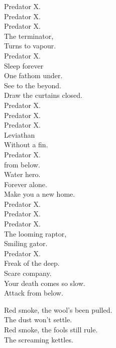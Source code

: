 Predator X. \\
Predator X. \\
Predator X. \\
The terminator, \\
Turns to vapour. \\
Predator X. \\
Sleep forever \\
One fathom under. \\

See to the beyond. \\
Draw the curtains closed. \\

Predator X. \\
Predator X. \\
Predator X. \\
Leviathan \\
Without a fin. \\
Predator X. \\
 from below. \\
Water hero. \\

Forever alone. \\
Make you a new home. \\

Predator X. \\
Predator X. \\
Predator X. \\
The looming raptor, \\
Smiling gator. \\
Predator X. \\
Freak of the deep. \\
Scare company. \\

Your death comes so slow. \\
Attack from below. \\





Red smoke, the wool's been pulled. \\
The dust won't settle. \\
Red smoke, the fools still rule. \\
The screaming kettles. \\

